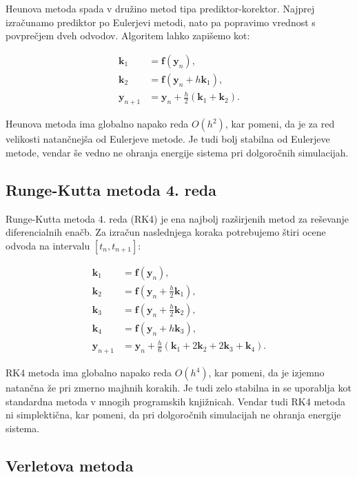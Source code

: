 \documentclass[12pt,a4paper]{article}
\begin{document}
Heunova metoda spada v družino metod tipa prediktor-korektor. Najprej izračunamo prediktor po Eulerjevi metodi, nato pa popravimo vrednost s povprečjem dveh odvodov. Algoritem lahko zapišemo kot:

\begin{align}
\mathbf{k}_1 &= \mathbf{f}(\mathbf{y}_n), \\
\mathbf{k}_2 &= \mathbf{f}(\mathbf{y}_n + h \mathbf{k}_1), \\
\mathbf{y}_{n+1} &= \mathbf{y}_n + \frac{h}{2}(\mathbf{k}_1 + \mathbf{k}_2).
\end{align}

Heunova metoda ima globalno napako reda $O(h^2)$, kar pomeni, da je za red velikosti natančnejša od Eulerjeve metode. Je tudi bolj stabilna od Eulerjeve metode, vendar še vedno ne ohranja energije sistema pri dolgoročnih simulacijah.

\subsection{Runge-Kutta metoda 4. reda}

Runge-Kutta metoda 4. reda (RK4) je ena najbolj razširjenih metod za reševanje diferencialnih enačb. Za izračun naslednjega koraka potrebujemo štiri ocene odvoda na intervalu $[t_n, t_{n+1}]$:

\begin{align}
\mathbf{k}_1 &= \mathbf{f}(\mathbf{y}_n), \\
\mathbf{k}_2 &= \mathbf{f}(\mathbf{y}_n + \tfrac{h}{2}\mathbf{k}_1), \\
\mathbf{k}_3 &= \mathbf{f}(\mathbf{y}_n + \tfrac{h}{2}\mathbf{k}_2), \\
\mathbf{k}_4 &= \mathbf{f}(\mathbf{y}_n + h \mathbf{k}_3), \\
\mathbf{y}_{n+1} &= \mathbf{y}_n + \tfrac{h}{6}(\mathbf{k}_1 + 2\mathbf{k}_2 + 2\mathbf{k}_3 + \mathbf{k}_4).
\end{align}

RK4 metoda ima globalno napako reda $O(h^4)$, kar pomeni, da je izjemno natančna že pri zmerno majhnih korakih. Je tudi zelo stabilna in se uporablja kot standardna metoda v mnogih programskih knjižnicah. Vendar tudi RK4 metoda ni simplektična, kar pomeni, da pri dolgoročnih simulacijah ne ohranja energije sistema.

\subsection{Verletova metoda}
\end{document}

